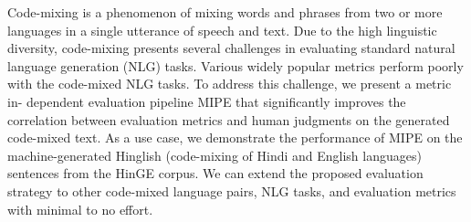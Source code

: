 Code-mixing is a phenomenon of mixing words and phrases from two or more languages in a single utterance of speech and text. Due to the high linguistic diversity, code-mixing presents several challenges in evaluating standard natural language generation (NLG) tasks. Various widely popular metrics perform poorly with the code-mixed NLG tasks. To address this challenge, we present a metric in- dependent evaluation pipeline MIPE that significantly improves the correlation between evaluation metrics and human judgments on the generated code-mixed text. As a use case, we demonstrate the performance of MIPE on the machine-generated Hinglish (code-mixing of Hindi and English languages) sentences from the HinGE corpus. We can extend the proposed evaluation strategy to other code-mixed language pairs, NLG tasks, and evaluation metrics with minimal to no effort.
